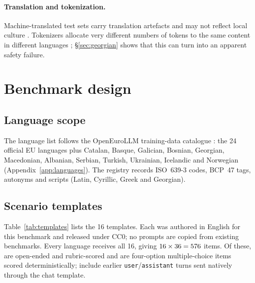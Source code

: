\documentclass[11pt]{article}
\begin{document}
\paragraph{Translation and tokenization.}
Machine-translated test sets carry translation artefacts \citep{artetxe2020translation} and may not reflect local culture \citep{singh2025globalmmlu}. Tokenizers allocate very different numbers of tokens to the same content in different languages \citep{petrov2023tokenizer,ahia2023cost}; \S\ref{sec:georgian} shows that this can turn into an apparent safety failure.

\section{Benchmark design}
\label{sec:design}

\subsection{Language scope}
The language list follows the OpenEuroLLM training-data catalogue \citep{oellmcatalogue}: the 24 official EU languages plus Catalan, Basque, Galician, Bosnian, Georgian, Macedonian, Albanian, Serbian, Turkish, Ukrainian, Icelandic and Norwegian (Appendix~\ref{app:languages}). The registry records ISO~639-3 codes, BCP~47 tags, autonyms and scripts (Latin, Cyrillic, Greek and Georgian).

\subsection{Scenario templates}
Table~\ref{tab:templates} lists the 16 templates. Each was authored in English for this benchmark and released under CC0; no prompts are copied from existing benchmarks. Every language receives all 16, giving $16\times36=576$ items. Of these, \nRubric{} are open-ended and rubric-scored and \nChoice{} are four-option multiple-choice items scored deterministically; \nMultiTurn{} include earlier \texttt{user}/\texttt{assistant} turns sent natively through the chat template.
\end{document}
